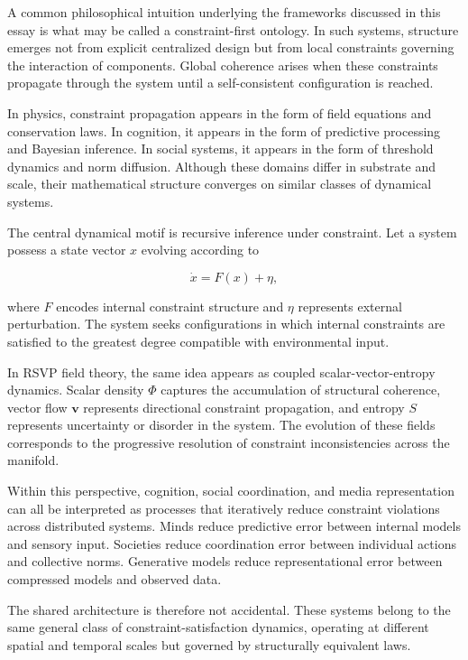 \documentclass[12pt,a4paper]{article}
\theoremstyle{plain}
\theoremstyle{definition}
\begin{document}
A common philosophical intuition underlying the frameworks discussed in this essay is what may be called a constraint-first ontology. In such systems, structure emerges not from explicit centralized design but from local constraints governing the interaction of components. Global coherence arises when these constraints propagate through the system until a self-consistent configuration is reached.

In physics, constraint propagation appears in the form of field equations and conservation laws. In cognition, it appears in the form of predictive processing and Bayesian inference. In social systems, it appears in the form of threshold dynamics and norm diffusion. Although these domains differ in substrate and scale, their mathematical structure converges on similar classes of dynamical systems.

The central dynamical motif is recursive inference under constraint. Let a system possess a state vector $x$ evolving according to

\begin{equation}
\dot{x} = F(x) + \eta,
\end{equation}

where $F$ encodes internal constraint structure and $\eta$ represents external perturbation. The system seeks configurations in which internal constraints are satisfied to the greatest degree compatible with environmental input.

In RSVP field theory, the same idea appears as coupled scalar-vector-entropy dynamics. Scalar density $\Phi$ captures the accumulation of structural coherence, vector flow $\mathbf{v}$ represents directional constraint propagation, and entropy $S$ represents uncertainty or disorder in the system. The evolution of these fields corresponds to the progressive resolution of constraint inconsistencies across the manifold.

Within this perspective, cognition, social coordination, and media representation can all be interpreted as processes that iteratively reduce constraint violations across distributed systems. Minds reduce predictive error between internal models and sensory input. Societies reduce coordination error between individual actions and collective norms. Generative models reduce representational error between compressed models and observed data.

The shared architecture is therefore not accidental. These systems belong to the same general class of constraint-satisfaction dynamics, operating at different spatial and temporal scales but governed by structurally equivalent laws.
\end{document}

